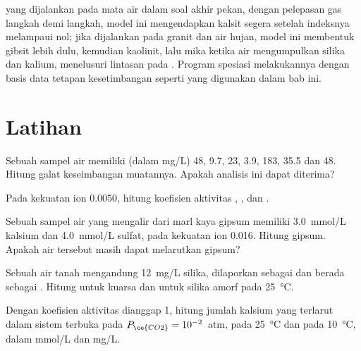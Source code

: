  yang dijalankan pada mata air dalam soal akhir pekan, dengan pelepasan gas
langkah demi langkah, model ini mengendapkan kalsit segera setelah indeksnya melampaui nol; jika dijalankan pada
granit dan air hujan, model ini membentuk gibsit lebih dulu, kemudian kaolinit, lalu
mika ketika air mengumpulkan silika dan kalium, menelusuri lintasan pada
. Program spesiasi melakukannya dengan basis data tetapan kesetimbangan
seperti yang digunakan dalam bab ini.

\section{Latihan}

\begin{exercise}[$\star$]\label{exo:b3:water-rock-interaction:1}
Sebuah sampel air memiliki (dalam \unit{mg/L})  48,  9.7,  23,  3.9,
 183,  35.5 dan  48. Hitung galat keseimbangan
muatannya. Apakah analisis ini dapat diterima?
\end{exercise}

\begin{exercise}[$\star$]\label{exo:b3:water-rock-interaction:2}
Pada kekuatan ion 0.0050, hitung koefisien aktivitas
, , dan .
\end{exercise}

\begin{exercise}[$\star$]\label{exo:b3:water-rock-interaction:3}
Sebuah sampel air yang mengalir dari marl kaya gipsum memiliki \qty{3.0}{mmol/L} kalsium dan
\qty{4.0}{mmol/L} sulfat, pada kekuatan ion 0.016. Hitung
 gipsum. Apakah air tersebut masih dapat melarutkan gipsum?
\end{exercise}

\begin{exercise}[$\star$]\label{exo:b3:water-rock-interaction:4}
Sebuah air tanah mengandung \qty{12}{mg/L} silika, dilaporkan sebagai  dan
berada sebagai . Hitung  untuk kuarsa dan untuk
silika amorf pada \qty{25}{\celsius}.
\end{exercise}

\begin{exercise}[$\star\star$]\label{exo:b3:water-rock-interaction:5}
Dengan koefisien aktivitas dianggap 1, hitung jumlah kalsium yang terlarut dalam
sistem terbuka pada $P_{\ce{CO2}} = 10^{-2}$~atm, pada \qty{25}{\celsius} dan
pada \qty{10}{\celsius}, dalam \unit{mmol/L} dan \unit{mg/L}.
\end{exercise}

